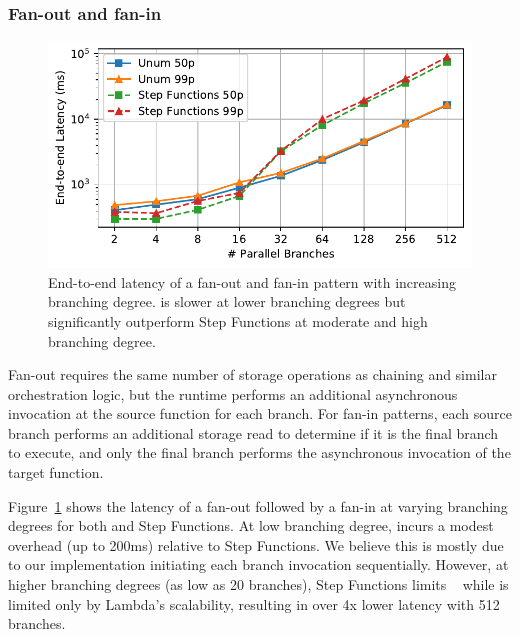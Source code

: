 \subsubsection{Fan-out and fan-in}\label{sec:eval:fan-out}

\begin{figure}[t]
  \centering
  \includegraphics[width=\columnwidth]{figures/MapMicroLatency.pdf}
  \caption{End-to-end latency of a fan-out and fan-in pattern with increasing
branching degree. \name{} is slower at lower branching degrees but significantly
outperform Step Functions at moderate and high branching degree.}
  \label{fig:mapmicrolatency}
\end{figure}

Fan-out requires the same number of storage operations as chaining and similar
orchestration logic, but the \name{} runtime performs an additional asynchronous
invocation at the source function for each branch. For fan-in patterns, each
source branch performs an additional storage read to determine if it is the
final branch to execute, and only the final branch performs the asynchronous
invocation of the target function.


Figure~\ref{fig:mapmicrolatency} shows the latency of a fan-out followed by a
fan-in at varying branching degrees for both \name{} and Step Functions. At
low branching degree, \name{} incurs a modest overhead (up to 200ms) relative
to Step Functions. We believe this is mostly due to our implementation
initiating each branch invocation sequentially. However, at higher branching
degrees (as low as 20 branches), Step Functions limits ~\cite{aws-step-functions-map-state} while
\name{} is limited only by Lambda's scalability, resulting in over 4x lower
latency with 512 branches.

